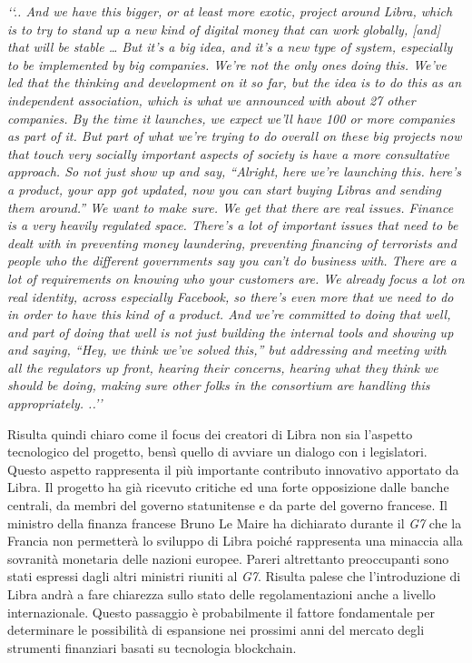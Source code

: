 \textit{‘‘.. And we have this bigger, or at least more exotic, project around Libra, which is to try to stand up a new kind of digital money that can work globally, [and] that will be stable … But it’s a big idea, and it’s a new type of system, especially to be implemented by big companies. We’re not the only ones doing this. We’ve led that the thinking and development on it so far, but the idea is to do this as an independent association, which is what we announced with about 27 other companies. By the time it launches, we expect we’ll have 100 or more companies as part of it. But part of what we’re trying to do overall on these big projects now that touch very socially important aspects of society is have a more consultative approach. So not just show up and say, “Alright, here we’re launching this. here’s a product, your app got updated, now you can start buying Libras and sending them around.” We want to make sure. We get that there are real issues. Finance is a very heavily regulated space. There’s a lot of important issues that need to be dealt with in preventing money laundering, preventing financing of terrorists and people who the different governments say you can’t do business with. There are a lot of requirements on knowing who your customers are. We already focus a lot on real identity, across especially Facebook, so there’s even more that we need to do in order to have this kind of a product. And we’re committed to doing that well, and part of doing that well is not just building the internal tools and showing up and saying, “Hey, we think we’ve solved this,” but addressing and meeting with all the regulators up front, hearing their concerns, hearing what they think we should be doing, making sure other folks in the consortium are handling this appropriately. ..’’}

Risulta quindi chiaro come il focus dei creatori di Libra non sia l'aspetto tecnologico del progetto, bensì quello di avviare un dialogo con i legislatori.  Questo aspetto rappresenta il più importante contributo innovativo apportato da Libra. Il progetto ha già ricevuto critiche ed una forte opposizione dalle banche centrali, da membri del governo statunitense e da parte del governo francese. Il ministro della finanza francese Bruno Le Maire ha dichiarato durante il \textit{G7} che la Francia non permetterà lo sviluppo di Libra poiché rappresenta una minaccia alla sovranità monetaria delle nazioni europee. Pareri altrettanto preoccupanti sono stati espressi dagli altri ministri riuniti al \textit{G7}. Risulta palese che l'introduzione di Libra andrà a fare chiarezza sullo stato delle regolamentazioni anche a livello internazionale. Questo passaggio è probabilmente il fattore fondamentale per determinare le possibilità di espansione nei prossimi anni del mercato degli strumenti finanziari basati su tecnologia blockchain. 

